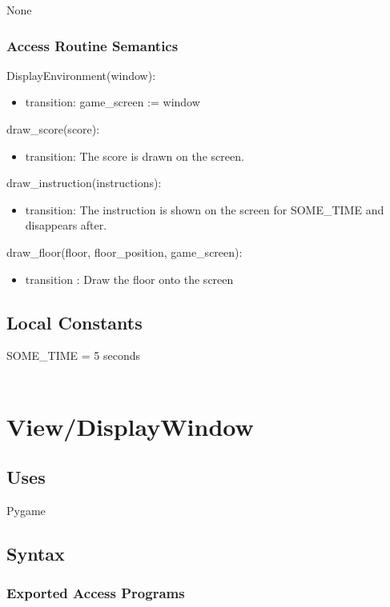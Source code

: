 \documentclass[12pt]{article}
\begin{document}
None

\subsubsection* {Access Routine Semantics}
\noindent DisplayEnvironment(window):
\begin{itemize}
    \item transition: game\_screen := window
\end{itemize}

\noindent draw\_score(score):
\begin{itemize}
    \item transition: The score is drawn on the screen.
\end{itemize}

\noindent draw\_instruction(instructions):
\begin{itemize}
    \item transition: The instruction is shown on the screen for SOME\_TIME and disappears after.
\end{itemize}

\noindent draw\_floor(floor, floor\_position, game\_screen):
\begin{itemize}
    \item transition : Draw the floor onto the screen
\end{itemize}

\subsection*{Local Constants}
SOME\_TIME = 5 seconds\\\
\newpage
\section*{View/DisplayWindow}

\subsection* {Uses}
Pygame

\subsection* {Syntax}

\subsubsection* {Exported Access Programs}
\end{document}
